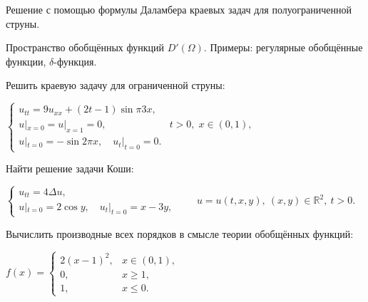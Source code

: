 
\begin{cond}
	Решение с помощью формулы Даламбера краевых задач для полуограниченной струны.
\end{cond}

\begin{cond}
	Пространство обобщённых функций $D'(\Omega)$. Примеры: регулярные обобщённые функции, $\delta$-функция.
\end{cond}

\begin{cond}
	Решить краевую задачу для ограниченной струны:

	\(
	\begin{cases}
		u_{tt} = 9u_{xx} + (2t - 1)\sin \pi3x,           \\
		u|_{x=0} = u|_{x=1} = 0, & t > 0,\; x \in (0,1), \\
		u|_{t=0} = -\sin 2\pi x,\quad u_t|_{t=0} = 0.
	\end{cases}
	\)
\end{cond}

\begin{cond}
	Найти решение задачи Коши:

	\(
	\begin{cases}
		u_{tt} = 4\Delta u, \\
		u|_{t=0} = 2\cos y,\quad u_t|_{t=0} = x - 3y,
	\end{cases}
	\qquad
	u = u(t,x,y),\ (x,y)\in\mathbb{R}^2,\ t>0.
	\)
\end{cond}

\begin{sol}

\end{sol}

\begin{out}

\end{out}

\newpage
{}
\begin{cond}
	Вычислить производные всех порядков в смысле теории обобщённых функций:

	\(
	f(x) =
	\begin{cases}
		2(x-1)^2, & x \in (0,1), \\
		0,        & x \ge 1,     \\
		1,        & x \le 0.
	\end{cases}
	\)
\end{cond}

